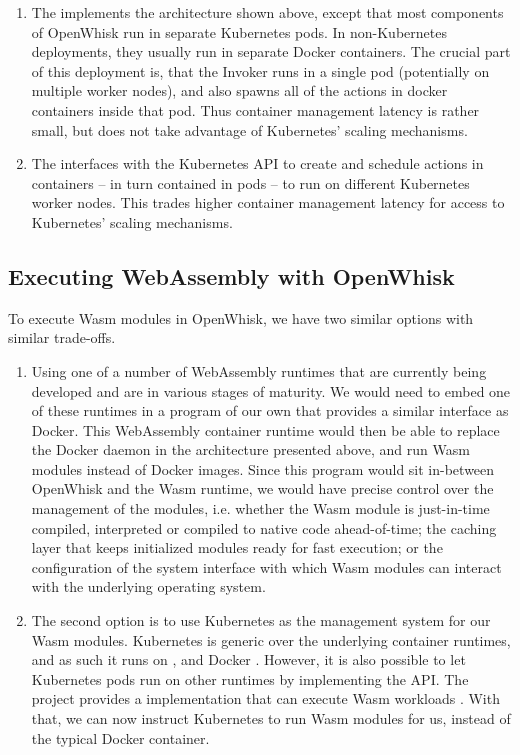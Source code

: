 \begin{enumerate}
    \item The  implements the architecture shown above, except that most components of OpenWhisk run in separate Kubernetes pods. In non-Kubernetes deployments, they usually run in separate Docker containers. The crucial part of this deployment is, that the Invoker runs in a single pod (potentially on multiple worker nodes), and also spawns all of the actions in docker containers inside that pod. Thus container management latency is rather small, but does not take advantage of Kubernetes' scaling mechanisms.
    \item The  interfaces with the Kubernetes API to create and schedule actions in containers -- in turn contained in pods -- to run on different Kubernetes worker nodes. This trades higher container management latency for access to Kubernetes' scaling mechanisms.
\end{enumerate}

\subsection{Executing WebAssembly with OpenWhisk}

To execute Wasm modules in OpenWhisk, we have two similar options with similar trade-offs.

\begin{enumerate}
    \item Using one of a number of WebAssembly runtimes that are currently being developed and are in various stages of maturity. We would need to embed one of these runtimes in a program of our own that provides a similar interface as Docker. This WebAssembly container runtime would then be able to replace the Docker daemon in the architecture presented above, and run Wasm modules instead of Docker images. Since this program would sit in-between OpenWhisk and the Wasm runtime, we would have precise control over the management of the modules, i.e. whether the Wasm module is just-in-time compiled, interpreted or compiled to native code ahead-of-time; the caching layer that keeps initialized modules ready for fast execution; or the configuration of the system interface with which Wasm modules can interact with the underlying operating system.
    \item The second option is to use Kubernetes as the management system for our Wasm modules. Kubernetes is generic over the underlying container runtimes, and as such it runs on ,  and Docker \cite{Kub2021}. However, it is also possible to let Kubernetes pods run on other runtimes by implementing the  API. The  project provides a  implementation that can execute Wasm workloads \cite{Krustlet2021}. With that, we can now instruct Kubernetes to run Wasm modules for us, instead of the typical Docker container.
\end{enumerate}

